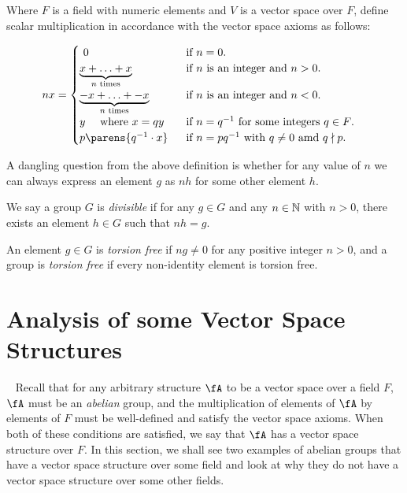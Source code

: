 \begin{definition}
  Where $F$ is a field with numeric elements and $V$ is a vector space over $F$,
  define scalar multiplication in accordance with the vector space axioms
  as follows:
  
  \begin{align}
    nx &= \begin{cases}~\label{def:scalar-multiplication}
      0 & \text{if $n = 0$.} \\
      \underbrace{x + \ldots + x}_{\text{$n$ times}} & \text{if $n$ is an integer and $n > 0$.} \\
      \underbrace{-x + \ldots + -x}_{\text{$n$ times}} & \text{if $n$ is an integer and $n < 0$.} \\
      y \quad \text{ where } x = qy \quad & \text{if $n = q^{-1}$ for some integers $q \in F$.} \\
      p \parens{q^{-1} \cdot x} &\text{if $n = pq^{-1}$ with $q \neq 0$ amd $q \nmid p$.}
    \end{cases}
  \end{align}
\end{definition}

A dangling question from the above definition is whether for any value of $n$
we can always express an element $g$ as $nh$ for some other element $h$.
\begin{definition}
  We say a group $G$ is \emph{divisible} if for any $g \in G$
  and any $n \in \mathbb{N}$ with $n > 0$, there exists an element $h \in G$
  such that $n h = g$.
\end{definition}
\begin{definition}
  An element $g \in G$ is \emph{torsion free} if $ng \neq 0$
    for any positive integer $n > 0$,
    and a group is \emph{torsion free} if every non-identity element is
    torsion free.
\end{definition}

\newpage
\section{Analysis of some Vector Space Structures}~\label{sec:analysis-vec-space-structures}
Recall that for any arbitrary structure $\fA$ to be a vector space over a field $F$,
$\fA$ must be an \emph{abelian} group, and the multiplication of elements of $\fA$
by elements of $F$ must be well-defined and satisfy the vector space axioms.
When both of these conditions are satisfied,
we say that $\fA$ has a vector space structure over $F$.
In this section, we shall see two examples of abelian groups that have a vector space
structure over some field and look at why they do not have a vector space structure
over some other fields.

